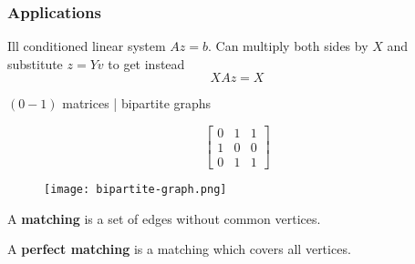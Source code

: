 \documentclass{beamer}
\begin{document}
\begin{frame}
  \frametitle{Applications}
  \begin{block}{Ill conditioned linear system $Az = b$.}
    Can multiply both sides by $X$  and substitute $z= Yv$ to get instead
    \begin{equation}
      XAz = X
    \end{equation}
  \end{block}
  \begin{block}{$(0-1)$ matrices | bipartite graphs}
  \end{block}
  \begin{minipage}{0.5\textwidth}
    \begin{equation}
      \begin{bmatrix}
        0 & 1 & 1 \\
        1 & 0 & 0 \\
        0 & 1 & 1
      \end{bmatrix}
    \end{equation}
  \end{minipage}
  \begin{minipage}{0.25\textwidth}
    \begin{figure}[ht]
      \centering
      \texttt{[image: bipartite-graph.png]}
      \caption{\label{fig:label} }
    \end{figure}
  \end{minipage}
  \begin{definition}
    A \textbf{matching} is a set of edges without common vertices.
  \end{definition}
  \begin{definition}
    A \textbf{perfect matching} is a matching which covers all vertices.
  \end{definition}






\end{frame}
\end{document}
